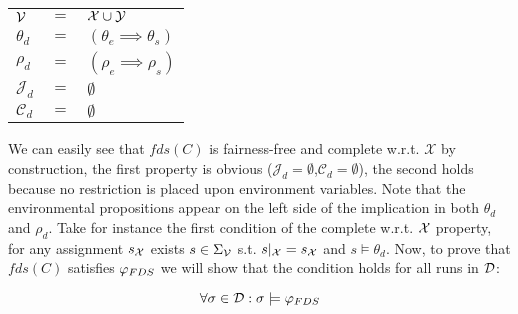 \begin{tabular}{ l c l }
	${\mathcal{V}}$ & $=$ & ${\mathcal{X}} \cup {\ensuremath{\mathcal{Y}}}$\\	
	$\theta_d$ & $=$ & $(\theta_e \implies \theta_s)$\\
	$\rho_d$ & $=$ & $(\rho_e \implies \rho_s)$\\	
	$\mathcal{J}_d$ & $=$ & $\emptyset$\\
	$\mathcal{C}_d$ & $=$ & $\emptyset$\\
\end{tabular}

We can easily see that $fds(C)$ is fairness-free and complete w.r.t. $\mathcal{X}$ by construction, the first property is obvious ($\mathcal{J}_d=\emptyset$,$\mathcal{C}_d=\emptyset$), the second holds because no restriction is placed upon environment variables. Note that the environmental propositions appear on the left side of the implication in both $\theta_d$ and $\rho_d$. Take for instance the first condition of the complete w.r.t. ${\mathcal{X}}$ property, for any assignment $s_{{\mathcal{X}}}$ exists $s \in \Sigma_{{\mathcal{V}}}$ s.t. $s|_{{\mathcal{X}}}=s_{{\mathcal{X}}}$ and $s \models \theta_d$. Now, to prove that $fds(C)$ satisfies $\varphi_{FDS}$ we will show that the condition holds for all runs in $\mathcal{D}$: 

\[\forall \sigma \in \mathcal{D}: \sigma \models \varphi_{FDS} \]


